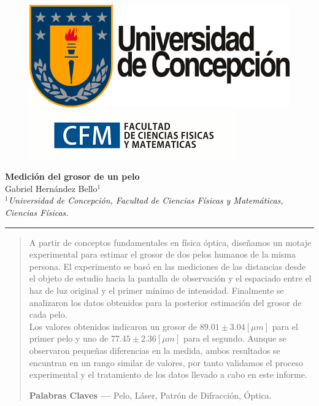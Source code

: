 \documentclass[10pt,a4paper]{article}
\author{Gabriel Hernandez Bello}
\begin{document}
	
	\begin{figure}[H]
		\raggedright
		\includegraphics[scale=0.2]{../Altura-Campanil/IMG/logo_udec.png} \hfill \includegraphics[scale=0.5]{../Altura-Campanil/IMG/cfm_logo.png}
	\end{figure}

	\vspace{6mm}
	\begin{center}
		{\Large \textbf{Medición del grosor de un pelo}}\\
		\vspace{2mm}
		{\large Gabriel Hernández Bello$^{1}$}\\
		\vspace{6.5mm}
		$^1$\textit{Universidad de Concepción, Facultad de Ciencias Físicas y Matemáticas, Ciencias Físicas. }\\
	\end{center}

	\begin{center}
		\textcolor{pinegreen}{\rule{150mm}{0.8mm}}
	\end{center}

	\begin{abstract}
	A partir de conceptos fundamentales en física óptica, diseñamos un motaje experimental para estimar el grosor de dos pelos humanos de la misma persona. El experimento se basó en las mediciones de las distancias desde el objeto de estudio hacia la pantalla de observación y  el espaciado entre el haz de luz original y el primer mínimo de intensidad. Finalmente se analizaron los datos obtenidos  para la posterior estimación  del grosor de cada pelo.\\
	
	Los valores obtenidos indicaron un grosor de  $89.01 \pm 3.04 [\mu m]$ para el primer pelo y uno de $77.45 \pm 2.36 [\mu m]$ para el segundo. Aunque se observaron pequeñas diferencias en la medida, ambos resultados se encuntran en un rango similar de valores, por tanto validamos el proceso experimental y el tratamiento de los datos llevado a cabo en este informe.

		\textbf{Palabras Claves ---}  Pelo, Láser, Patrón de Difracción, Óptica.
	\end{abstract}
	
\end{document}

